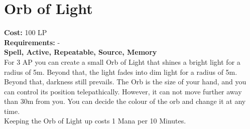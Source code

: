 \section{Orb of Light}\label{spell:orbOfLight}
\textbf{Cost:} 100 LP\\
\textbf{Requirements:} -\\
\textbf{Spell, Active, Repeatable, Source, Memory}\\
For 3 AP you can create a small Orb of Light that shines a bright light for a radius of 5m.
Beyond that, the light fades into dim light for a radius of 5m.
Beyond that, darkness still prevails.
The Orb is the size of your hand, and you can control its position telepathically.
However, it can not move further away than 30m from you.
You can decide the colour of the orb and change it at any time. \\
Keeping the Orb of Light up costs 1 Mana per 10 Minutes.